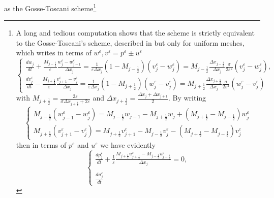 \documentclass[a4paper,french,english,10pt]{article}
\newcommand\eps{\varepsilon}
\begin{document}
as the Gosse-Toscani scheme\footnote{A 
long and tedious computation  shows that the  scheme is strictly
equivalent to 
  the   Gosse-Toscani's scheme, described in    \cite{Gosse} but only for
uniform meshes, which writes in terms of $w^{\eps} ,v^{\eps} =p^{\eps} \pm u^{\eps} $
\begin{equation*} \label{hhe:diagnum}
\left\{
\begin{array}{ll}
\displaystyle\frac{d w_j}{dt}
+\frac{ M_{j- \frac12} }{\varepsilon}
\frac{  w_j^{\eps}  -  w_{j-1}^{\eps} }{\Delta  x_j}=
\frac{1  }{\varepsilon\Delta  x_j}(1-M_{j-
\frac12})(v_j^{\eps}  -w_j^{\eps}  )=
 M_{j- \frac12}  
\frac{\Delta  x_{j- \frac12}}{\Delta  x_j}\frac{ \sigma }{2\varepsilon^2}
(v_j^{\eps} -w_j^{\eps} ),   \\
\displaystyle\frac{ dv_j^{\eps}  }{dt}
-\frac{  M_{j+ \frac12} }{\varepsilon}
\frac{  v_{j+1} ^{\eps} - v_j^{\eps} }{\Delta  x_j}=\frac{1  }{\varepsilon\Delta  x_j}(1-M_{j+
\frac12})(w_j ^{\eps}  -v_j^{\eps}  )
=
 M_{j+ \frac12} \frac{\Delta  x_{j+ \frac12}}{\Delta  x_j}
\frac{ \sigma}{2\varepsilon^2} (w_j^{\eps} -v_j^{\eps} )
\end{array}
\right.
\end{equation*}
with 
$M_{j+ \frac12} =\frac {2  \varepsilon }{\sigma\Delta  x_{j+ \frac12} + 2 
\varepsilon }
$%
and $ \Delta  x_{j+ \frac12}=\frac{\Delta  x_{j}+\Delta  x_{j+1}}{2}$. 
By writing
\begin{equation*} \label{hhe:toto}
\left\{
\begin{array}{ll}
M_{j- \frac12}
( w_{j-1}^{\eps}  - w_j^{\eps}    ) = M_{j- \frac12}w_{j-1} -M_{j+ \frac12}w_j + (M_{j+
\frac12}-M_{j- \frac12}) w_j^{\eps} \\
 M_{j+ \frac12} (  v_{j+1}^{\eps}  - v_j^{\eps} )=M_{j+ \frac12}
v_{j+1}^{\eps}  -M_{j- \frac12}v_j^{\eps}  -
(M_{j+ \frac12}-M_{j- \frac12})v_j^{\eps} 
\end{array}
\right.
\end{equation*}
then  in terms of $p^{\eps} $ and $u^{\eps} $ we have evidently
\begin{equation*} \label{eq:63num}
\left\{
\begin{array}{l}
\displaystyle\frac{dp_j^{\eps} }{dt }
+\frac{1}{\varepsilon}\frac{ M_{j+ \frac12}  u_{j+\frac12}^{\eps} 
-
M_{j- \frac12}  u_{j-\frac12}^{\eps}  }{\Delta  x_j}
=0,   \\
\\
\displaystyle\frac{du_j^{\eps} }{dt }

\end{array}
\end{equation*}}
\end{document}
